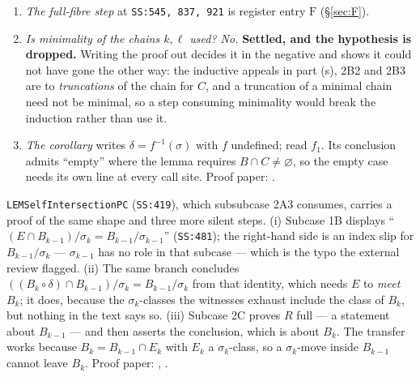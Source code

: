 \begin{enumerate}
  is not an implication: that lemma offers $B_{m-1}/\sigma_{m}$ \emph{or}
  $B_{m}/\sigma_{m}$. The second is excluded, but by an argument the text does
  not give: $B_{m}=B_{m-1}\cap E$ lies inside one $\sigma_{m}$-class, so the
  second alternative makes the last coordinate of $R'$ constant, and with
  $\proj_{1,\dots,|A|}(R')=(B/\delta)^{|A|}$ that yields
  $(B/\delta)^{|A|}\times B_{m}/\sigma_{m}\subseteq R'$ --- which the minimal
  choice of $m$ forbids. Sound, but a real step.
\item \emph{The full-fibre step} at \texttt{SS:545, 837, 921} is register entry
  $\mathrm F$ (\S\ref{sec:F}).
\item \emph{Is minimality of the chains $k,\ell$ used? No.} \textbf{Settled,
  and the hypothesis is dropped.} Writing the proof out decides it in the
  negative and shows it could not have gone the other way: the inductive
  appeals in part (s), 2B2 and 2B3 are to \emph{truncations} of the chain for
  $C$, and a truncation of a minimal chain need not be minimal, so a step
  consuming minimality would break the induction rather than use it.
\item \emph{The corollary} writes $\delta=f^{-1}(\sigma)$ with $f$ undefined;
  read $f_{1}$. Its conclusion admits ``empty'' where the lemma requires
  $B\cap C\neq\varnothing$, so the empty case needs its own line at every call
  site. Proof paper: .
\end{enumerate}

\texttt{LEMSelfIntersectionPC} (\texttt{SS:419}), which subsubcase 2A3
consumes, carries a proof of the same shape and three more silent steps. (i)
Subcase 1B displays ``$(E\cap B_{k-1})/\sigma_{k}=B_{k-1}/\sigma_{k-1}$''
(\texttt{SS:481}); the right-hand side is an index slip for
$B_{k-1}/\sigma_{k}$ --- $\sigma_{k-1}$ has no role in that subcase --- which
is the typo the external review flagged. (ii) The same branch concludes
$((B_{k}\circ\delta)\cap B_{k-1})/\sigma_{k}=B_{k-1}/\sigma_{k}$ from that
identity, which needs $E$ to \emph{meet} $B_{k}$; it does, because the
$\sigma_{k}$-classes the witnesses exhaust include the class of $B_{k}$, but
nothing in the text says so. (iii) Subcase 2C proves $R$ full --- a statement
about $B_{k-1}$ --- and then asserts the conclusion, which is about $B_{k}$.
The transfer works because $B_{k}=B_{k-1}\cap E_{k}$ with $E_{k}$ a
$\sigma_{k}$-class, so a $\sigma_{k}$-move inside $B_{k-1}$ cannot leave
$B_{k}$. Proof paper: ,
.

